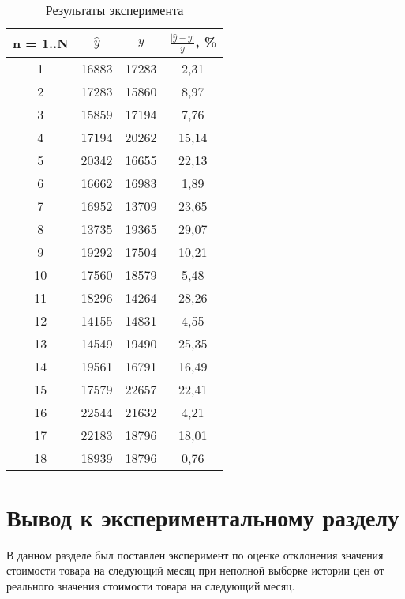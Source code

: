 \documentclass{bmstu}
\begin{document}
\begin{table}[H]
	\caption{Результаты эксперимента}
	\begin{center}
		\begin{tabular}{| c | c | c | c |} 
			\hline
			
			\textbf{n = 1..N} & \textbf{$\hat{y}$} & \textbf{$y$} & \textbf{$\frac{|\hat{y} - y|}{y}$, \%} \\  
			
			\hline
			1 & 16883 & 17283 & 2,31 \\
			\hline
			2 & 17283 & 15860 & 8,97 \\
			\hline
			3 & 15859 & 17194 & 7,76 \\
			\hline
			4 & 17194 & 20262 & 15,14 \\
			\hline
			5 & 20342 & 16655 & 22,13 \\
			\hline
			6 & 16662 & 16983 & 1,89 \\
			\hline
			7 & 16952 & 13709 & 23,65 \\
			\hline
			8 & 13735 & 19365 & 29,07 \\
			\hline
			9 & 19292 & 17504 & 10,21 \\
			\hline
			10 & 17560 & 18579 & 5,48 \\
			\hline
			11 & 18296 & 14264 & 28,26 \\
			\hline
			12 & 14155 & 14831 & 4,55 \\
			\hline
			13 & 14549 & 19490 & 25,35 \\
			\hline
			14 & 19561 & 16791 & 16,49 \\
			\hline
			15 & 17579 & 22657 & 22,41 \\
			\hline
			16 & 22544 & 21632 & 4,21 \\
			\hline
			17 & 22183 & 18796 & 18,01 \\
			\hline
			18 & 18939 & 18796 & 0,76 \\
			\hline
		\end{tabular}
	\end{center}
\end{table}

\section*{Вывод к экспериментальному разделу}

В данном разделе был поставлен эксперимент по оценке отклонения значения стоимости товара на следующий месяц при неполной выборке истории цен от реального значения стоимости товара на следующий месяц.
\end{document}
